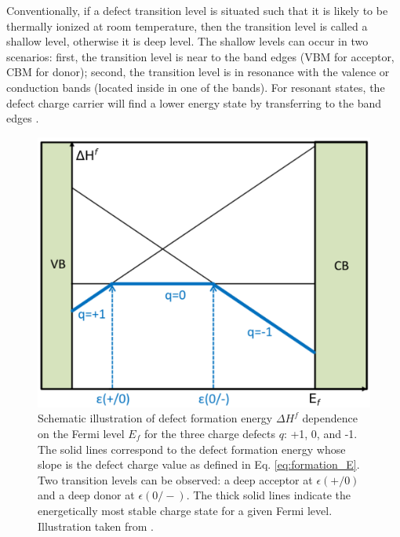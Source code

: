Conventionally, if a defect transition level is situated such that it is likely to be thermally ionized at room temperature, then the transition level is called a shallow level, otherwise it is deep level. The shallow levels can occur in two scenarios: first, the transition level is near to the band edges (VBM for acceptor, CBM for donor); second, the transition level is in resonance with the valence or conduction bands (located inside in one of the bands).  For resonant states, the defect charge carrier will find a lower energy state by transferring to the band edges \citep{Janotti2007}.  


\begin{figure}[tbh!]
    \centering
    \includegraphics[width=0.5\linewidth]{"images/computational/trans_level"}
    \caption[ Schematic illustration of defect formation energy $\Delta H^f$ dependence on the Fermi level $E_f$ for the three charge defects $q$: +1, 0, and -1 ]{Schematic illustration of defect formation energy $\Delta H^f$ dependence on the Fermi level $E_f$ for the three charge defects $q$: +1, 0, and -1. The solid lines correspond to the defect formation energy whose slope is the defect charge value as defined in Eq. \eqref{eq:formation_E}. Two transition levels can  be observed: a deep acceptor at  $\epsilon(+/0)$ and a deep donor at $\epsilon(0/-)$. The thick solid lines indicate the energetically  most stable charge state for a given Fermi level. Illustration taken from \citep{Freysoldt2014}.}
    \label{fig:trans_level}
\end{figure}






